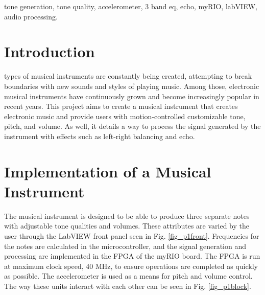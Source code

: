 \begin{IEEEkeywords}
tone generation, tone quality, accelerometer, 3 band eq, echo, myRIO, labVIEW, audio processing. 
\end{IEEEkeywords}

\IEEEpeerreviewmaketitle



\section{Introduction}
%
%
%
%
 types of musical instruments are constantly being created, attempting to break boundaries with new sounds and styles of playing music.
Among those, electronic musical instruments  have continuously grown and become increasingly popular in recent years.
This project aims to create a musical instrument that creates electronic music and provide users with motion-controlled customizable tone, pitch, and volume.
As well, it details a way to process the signal generated by the instrument with effects such as left-right balancing and echo.

\section{Implementation of a Musical Instrument}
The musical instrument is designed to be able to produce three separate notes with adjustable tone qualities and volumes.
 These attributes are varied by the user through the LabVIEW front panel seen in Fig. \ref{fig_p1front}.
 Frequencies for the notes are calculated in the microcontroller, and the signal generation and processing are implemented in the FPGA of the myRIO board.
 The FPGA is run at maximum clock speed, 40 MHz, to ensure operations are completed as quickly as possible.
 The accelerometer is used as a means for pitch and volume control.
 The way these units interact with each other can be seen in Fig. \ref{fig_p1block}.



